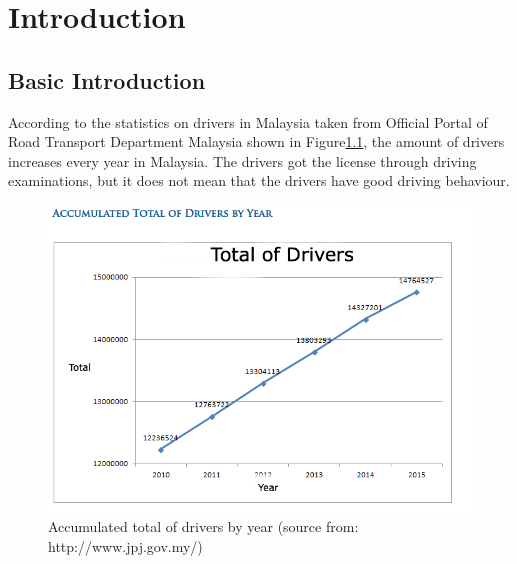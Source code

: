 \chapter{Introduction}
\section{Basic Introduction}

According to the statistics on drivers in Malaysia taken from Official Portal of Road Transport Department Malaysia shown in Figure\ref{fig:driver}, the amount of drivers increases every year in Malaysia. The drivers got the license through driving examinations, but it does not mean that the drivers have good driving behaviour.
 
\begin{figure}[hbt!]\centering
\includegraphics[width=.75\textwidth]{image/totaldriver}
\caption{Accumulated total of drivers by year (source from: http://www.jpj.gov.my/) }
\label{fig:driver}
\end{figure}

